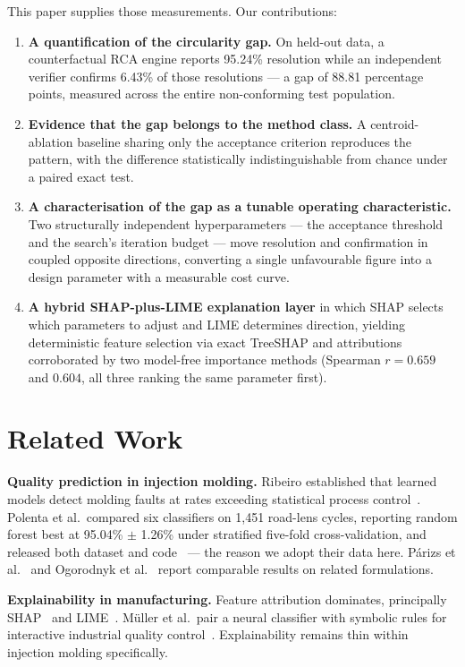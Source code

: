 \documentclass[11pt,a4paper]{article}
\begin{document}
This paper supplies those measurements. Our contributions:

\begin{enumerate}
\item \textbf{A quantification of the circularity gap.} On held-out data, a counterfactual RCA engine reports 95.24\% resolution while an independent verifier confirms 6.43\% of those resolutions --- a gap of 88.81 percentage points, measured across the entire non-conforming test population.
\item \textbf{Evidence that the gap belongs to the method class.} A centroid-ablation baseline sharing only the acceptance criterion reproduces the pattern, with the difference statistically indistinguishable from chance under a paired exact test.
\item \textbf{A characterisation of the gap as a tunable operating characteristic.} Two structurally independent hyperparameters --- the acceptance threshold and the search's iteration budget --- move resolution and confirmation in coupled opposite directions, converting a single unfavourable figure into a design parameter with a measurable cost curve.
\item \textbf{A hybrid SHAP-plus-LIME explanation layer} in which SHAP selects which parameters to adjust and LIME determines direction, yielding deterministic feature selection via exact TreeSHAP and attributions corroborated by two model-free importance methods (Spearman $r = 0.659$ and $0.604$, all three ranking the same parameter first).
\end{enumerate}

\section{Related Work}

\textbf{Quality prediction in injection molding.} Ribeiro established that learned models detect molding faults at rates exceeding statistical process control~\cite{ribeiroB2005}. Polenta et al.\ compared six classifiers on 1{,}451 road-lens cycles, reporting random forest best at 95.04\% $\pm$ 1.26\% under stratified five-fold cross-validation, and released both dataset and code~\cite{polenta2022} --- the reason we adopt their data here. P\'{a}rizs et al.~\cite{parizs2022} and Ogorodnyk et al.~\cite{ogorodnyk2019} report comparable results on related formulations.

\textbf{Explainability in manufacturing.} Feature attribution dominates, principally SHAP~\cite{lundberg2017} and LIME~\cite{ribeiro2016}. M\"{u}ller et al.\ pair a neural classifier with symbolic rules for interactive industrial quality control~\cite{muller2022}. Explainability remains thin within injection molding specifically.
\end{document}
